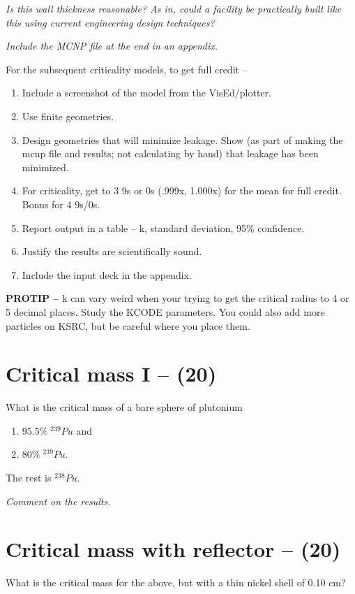\documentclass[11pt,a4paper]{article}
\begin{document}
\textit{Is this wall thickness reasonable? As in, could a facility be practically built like this using current engineering design techniques?}

\textit{Include the MCNP file at the end in an appendix.}





\newpage

For the subsequent criticality models, to get full credit -- 
\begin{enumerate}
    \item Include a screenshot of the model from the VisEd/plotter.
    \item Use finite geometries.
    \item Design geometries that will minimize leakage. Show (as part of making the mcnp file and results; not calculating by hand) that leakage has been minimized.
    \item For criticality, get to 3 9s or 0s (.999x, 1.000x) for the mean for full credit. Bonus for 4 9s/0s.
    \item Report output in a table -- k, standard deviation, 95\% confidence. 
    \item Justify the results are scientifically sound.
    \item Include the input deck in the appendix.
\end{enumerate}


\textbf{PROTIP -- }k can vary weird when your trying to get the critical radius to 4 or 5 decimal places. Study the KCODE parameters. You could also add more particles on KSRC, but be careful where you place them.

\newpage

\section{Critical mass I -- (20)}
What is the critical mass of a bare sphere of plutonium
\begin{enumerate}
    \item$95.5\% \; ^{239}Pu$ and 
    \item$80\% \; ^{239}Pu$.
\end{enumerate}
The rest is $^{238}Pu$.

\textit{Comment on the results.}


\newpage

\section{Critical mass with reflector -- (20)}
What is the critical mass for the above, but with a thin nickel shell of 0.10 cm?
\end{document}
